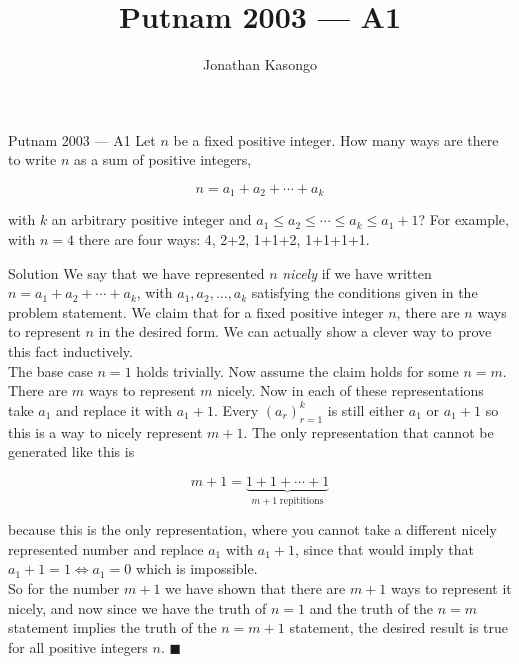 \documentclass{article}
\author{Jonathan Kasongo}
\title{Putnam 2003 --- A1}
\begin{document}
\maketitle

\begin{problem}{Putnam 2003 --- A1}
Let $n$ be a fixed positive integer. How many ways are there to
write $n$ as a sum of positive integers,

$$
n = a_1 + a_2 + \cdots + a_k
$$

with $k$ an arbitrary positive integer and
$a_1 \leq a_2 \leq \cdots \leq a_k \leq a_1 + 1$? For example, with $n=4$
there are four ways: 4, 2+2, 1+1+2, 1+1+1+1.
\end{problem}

\begin{solution}{Solution}
We say that we have represented $n$ \textit{nicely} if we have written
$n = a_1 + a_2 + \cdots + a_k$, with $a_1, a_2, ...,a_k$ satisfying the
conditions given in the problem statement.
We claim that for a fixed positive integer $n$, there are $n$ ways to
represent $n$ in the desired form. We can actually show a clever way to
prove this fact inductively. \\

The base case $n=1$ holds trivially. Now assume the claim holds for some
$n=m$. There are $m$ ways to represent $m$ nicely. Now in each of these
representations take $a_1$ and replace it with $a_1 + 1$. Every
$(a_r)_{r=1}^k$ is still either $a_1$ or $a_1 + 1$ so this is a way to
nicely represent $m+1$. The only representation that cannot be generated like this is

$$m+1 = \underbrace{1+1+\cdots+1}_{m + 1 \; \text{repititions}}$$

because this is the only representation, where you cannot take a different
nicely represented number and replace $a_1$ with $a_1 + 1$, since that
would imply that $a_1 + 1 = 1 \iff a_1 = 0$ which is impossible.\\

So for the number $m+1$ we have shown that there are $m+1$ ways to
represent it nicely, and now since we have the truth of $n=1$ and the
truth of the $n=m$ statement implies the truth of the $n=m+1$ statement,
the desired result is true for all positive integers $n$. $\blacksquare$
\end{solution}
\end{document}
